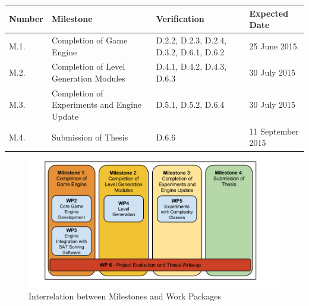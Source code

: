 \documentclass[a4paper]{article}
\begin{document}
\begin{center}
    \begin{tabular}{ | p{1.2cm}  | p{6.2cm} | p{4cm} | p{3cm} |}
    \hline
    \rowcolor{Gray}
    Number & Milestone & Verification & Expected Date \\ \hline

    M.1. & Completion of Game Engine & D.2.2, D.2.3, D.2.4, D.3.2, D.6.1, D.6.2 & 25 June 2015. \\ \hline

    M.2. & Completion of Level Generation Modules & D.4.1, D.4.2, D.4.3, D.6.3 & 30 July 2015 \\ \hline

    M.3. & Completion of Experiments and Engine Update & D.5.1, D.5.2, D.6.4 & 30 July 2015 \\ \hline

    M.4. & Submission of Thesis & D.6.6 & 11 September 2015 \\ \hline

    \hline
    \end{tabular}
    \label{milestones}
\end{center}

\begin{figure}[htbp]
  \centering
  \includegraphics[scale=0.4]{organisation(1)}
  \vspace{-3mm} 
  \caption{Interrelation between Milestones and Work Packages}
  \label{org}
\end{figure}


\pagebreak
\end{document}
